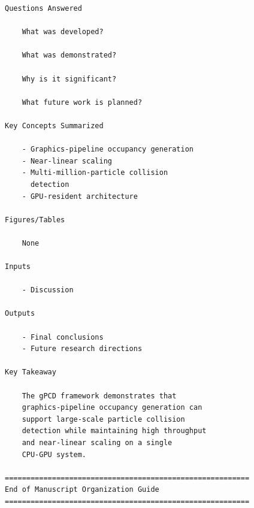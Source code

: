 \begin{verbatim}
Questions Answered

    What was developed?

    What was demonstrated?

    Why is it significant?

    What future work is planned?

Key Concepts Summarized

    - Graphics-pipeline occupancy generation
    - Near-linear scaling
    - Multi-million-particle collision
      detection
    - GPU-resident architecture

Figures/Tables

    None

Inputs

    - Discussion

Outputs

    - Final conclusions
    - Future research directions

Key Takeaway

    The gPCD framework demonstrates that
    graphics-pipeline occupancy generation can
    support large-scale particle collision
    detection while maintaining high throughput
    and near-linear scaling on a single
    CPU-GPU system.

=========================================================
End of Manuscript Organization Guide
=========================================================
\end{verbatim}